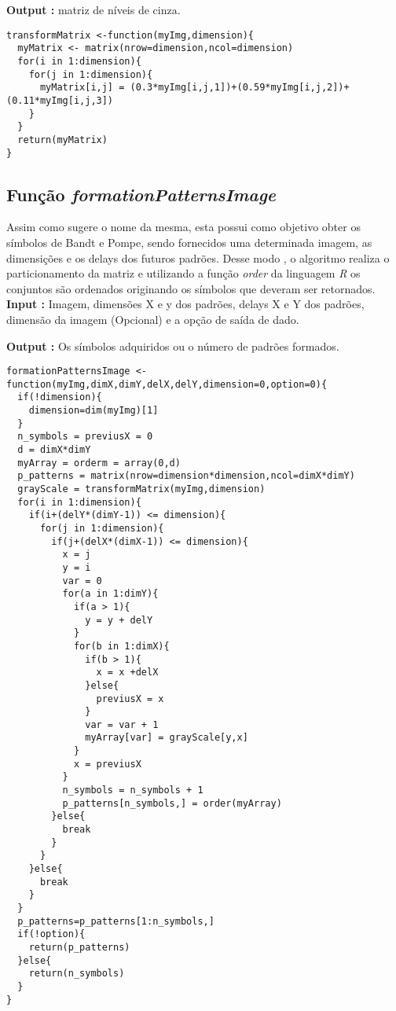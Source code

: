 \documentclass[12pt,letterpaper]{article}
\begin{document}
\textbf{Output :} matriz de níveis de cinza.\\

 \begin{lstlisting}
transformMatrix <-function(myImg,dimension){
  myMatrix <- matrix(nrow=dimension,ncol=dimension)
  for(i in 1:dimension){
    for(j in 1:dimension){
      myMatrix[i,j] = (0.3*myImg[i,j,1])+(0.59*myImg[i,j,2])+(0.11*myImg[i,j,3])
    }
  }
  return(myMatrix)
}
\end{lstlisting}

\subsection{Função \textit{formationPatternsImage}}

Assim como sugere o nome da mesma, esta possui como objetivo obter os símbolos de Bandt e Pompe, sendo fornecidos uma determinada imagem, as dimensições e os delays dos futuros padrões. Desse modo , o algoritmo realiza o particionamento da matriz e utilizando a função \textit{order} da linguagem \textit{R} os conjuntos são ordenados originando os símbolos que deveram ser retornados.\\

\textbf{Input :} Imagem, dimensões X e y dos padrões, delays X e Y dos padrões, dimensão da imagem (Opcional) e a opção de saída de dado.

\textbf{Output :} Os símbolos adquiridos ou o número de padrões formados.\\

\begin{lstlisting}
formationPatternsImage <-function(myImg,dimX,dimY,delX,delY,dimension=0,option=0){
  if(!dimension){
    dimension=dim(myImg)[1]
  }
  n_symbols = previusX = 0
  d = dimX*dimY
  myArray = orderm = array(0,d)
  p_patterns = matrix(nrow=dimension*dimension,ncol=dimX*dimY)
  grayScale = transformMatrix(myImg,dimension)
  for(i in 1:dimension){
    if(i+(delY*(dimY-1)) <= dimension){
      for(j in 1:dimension){
        if(j+(delX*(dimX-1)) <= dimension){ 
          x = j
          y = i
          var = 0
          for(a in 1:dimY){
            if(a > 1){
              y = y + delY
            }
            for(b in 1:dimX){
              if(b > 1){
                x = x +delX
              }else{
                previusX = x
              }
              var = var + 1
              myArray[var] = grayScale[y,x]
            }
            x = previusX
          }
          n_symbols = n_symbols + 1
          p_patterns[n_symbols,] = order(myArray)
        }else{
          break
        }
      }
    }else{
      break
    }
  }
  p_patterns=p_patterns[1:n_symbols,]
  if(!option){
    return(p_patterns)
  }else{
    return(n_symbols)
  }
}
\end{lstlisting}
\end{document}
